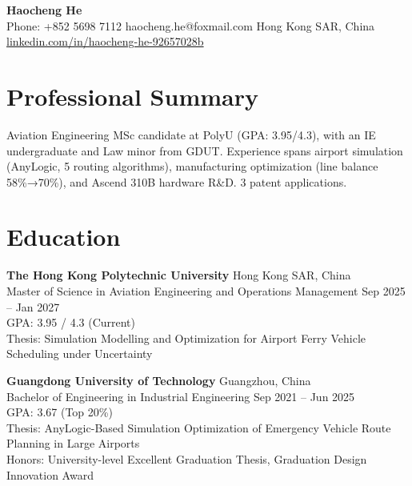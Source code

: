 \documentclass[10pt,a4paper]{article}
\begin{document}
\begin{center}
  {\large\bfseries Haocheng He} \\[2pt]
  Phone: +852 5698 7112 \enspace\textbar\enspace
  haocheng.he@foxmail.com \enspace\textbar\enspace
  Hong Kong SAR, China \\
  \href{https://linkedin.com/in/haocheng-he-92657028b}{linkedin.com/in/haocheng-he-92657028b}
\end{center}

\section{Professional Summary}
Aviation Engineering MSc candidate at PolyU (GPA: 3.95/4.3), with an IE undergraduate and Law minor from GDUT. Experience spans airport simulation (AnyLogic, 5 routing algorithms), manufacturing optimization (line balance 58\%→70\%), and Ascend 310B hardware R\&D. 3 patent applications.
\section{Education}

\textbf{The Hong Kong Polytechnic University} \hfill Hong Kong SAR, China \\
{\small Master of Science in Aviation Engineering and Operations Management} \hfill Sep 2025 -- Jan 2027 \\
{\small GPA: 3.95 / 4.3 (Current)} \\
{\small Thesis: Simulation Modelling and Optimization for Airport Ferry Vehicle Scheduling under Uncertainty}

\vspace{3pt}

\textbf{Guangdong University of Technology} \hfill Guangzhou, China \\
{\small Bachelor of Engineering in Industrial Engineering} \hfill Sep 2021 -- Jun 2025 \\
{\small GPA: 3.67 (Top 20\%)} \\
{\small Thesis: AnyLogic-Based Simulation Optimization of Emergency Vehicle Route Planning in Large Airports} \\
{\small Honors: University-level Excellent Graduation Thesis, Graduation Design Innovation Award}
\end{document}
